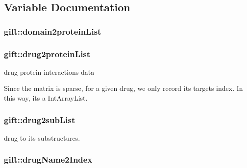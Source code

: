 \subsection{Variable Documentation}
\subsubsection[{\texorpdfstring{domain2protein\+List}{domain2proteinList}}]{ gift\+::domain2protein\+List}\hypertarget{namespacegift_ac99bcb1b736637f97e82be7503c725b5}{}\label{namespacegift_ac99bcb1b736637f97e82be7503c725b5}
\subsubsection[{\texorpdfstring{drug2protein\+List}{drug2proteinList}}]{ gift\+::drug2protein\+List}\hypertarget{namespacegift_a2c0005015565d7432dd64fd6bafd3395}{}\label{namespacegift_a2c0005015565d7432dd64fd6bafd3395}


drug-\/protein interactions data 

Since the matrix is sparse, for a given drug, we only record its targets\textquotesingle{} index. In this way, it\textquotesingle{}s a Int\+Array\+List. 
\subsubsection[{\texorpdfstring{drug2sub\+List}{drug2subList}}]{ gift\+::drug2sub\+List}\hypertarget{namespacegift_a73506f6b6bc3e6f6fedfacf8bf0d38f1}{}\label{namespacegift_a73506f6b6bc3e6f6fedfacf8bf0d38f1}


drug to its substructures. 

\subsubsection[{\texorpdfstring{drug\+Name2\+Index}{drugName2Index}}]{ gift\+::drug\+Name2\+Index}\hypertarget{namespacegift_a3385bc2f0aa26289e7f7d69635207e5d}{}\label{namespacegift_a3385bc2f0aa26289e7f7d69635207e5d}


